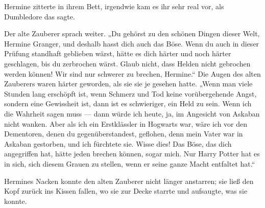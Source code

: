 Hermine zitterte in ihrem Bett, irgendwie kam es ihr sehr real vor, als Dumbledore das sagte.

Der alte Zauberer sprach weiter.
„Du gehörst zu den schönen Dingen dieser Welt, Hermine Granger, und deshalb hasst dich auch das Böse. Wenn du auch in dieser Prüfung standhaft geblieben wärst, hätte es dich härter und noch härter geschlagen, bis du zerbrochen wärst. Glaub nicht, dass Helden nicht gebrochen werden können! Wir sind nur schwerer zu brechen, Hermine.“ Die Augen des alten Zauberers waren härter geworden, als sie sie je gesehen hatte.
„Wenn man viele Stunden lang erschöpft ist, wenn Schmerz und Tod keine vorübergehende Angst, sondern eine Gewissheit ist, dann ist es schwieriger, ein Held zu sein. Wenn ich die Wahrheit sagen muss — dann würde ich heute, ja, im Angesicht von Askaban nicht wanken. Aber als ich ein Erstklässler in Hogwarts war, wäre ich vor den Dementoren, denen du gegenüberstandest, geflohen, denn mein Vater war in Askaban gestorben, und ich fürchtete sie. Wisse dies! Das Böse, das dich angegriffen hat, hätte jeden brechen können, sogar mich. Nur Harry Potter hat es in sich, sich diesem Grauen zu stellen, wenn er seine ganze Macht entfaltet hat.“

Hermines Nacken konnte den alten Zauberer nicht länger anstarren; sie ließ den Kopf zurück ins Kissen fallen, wo sie zur Decke starrte und aufsaugte, was sie konnte.

